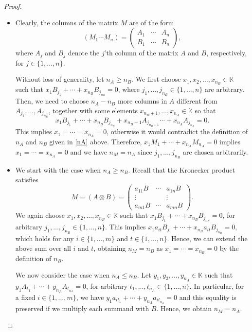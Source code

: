 \documentclass[11pt]{amsart}
\theoremstyle{plain}
\theoremstyle{definition}
\numberwithin{equation}{section}
\newcommand{\K}{\mathbb{K}}
\begin{document}
\begin{proof}\hfill
\begin{itemize}
\item[i.] Clearly, the columns of the matrix $M$ are of the form $$(M_1 \cdots M_n)=\begin{pmatrix}
A_{1} & \cdots & A_{n}\\
B_{1} & \cdots & B_{n}
\end{pmatrix},$$
where $A_{j}$ and $B_j$ denote the $j$'th column of the matrix $A$ and $B$, respectively, for $j\in\{1,\ldots,n\}$.

Without loss of generality, let $n_A\geq n_B$. We first choose $x_1, x_2, \ldots, x_{n_B}\in\K$ such that $x_1 B_{j_1} + \cdots + x_{n_B} B_{j_{n_B}}=0$, where $j_1,\ldots,j_{n_B}\in\{1,\ldots,n\}$ are arbitrary. Then, we need to choose $n_A-n_B$ more columns in $A$ different from $A_{j_1},\ldots,A_{j_{n_B}}$, together with some elements $x_{n_B+1}, \ldots, x_{n_A}\in\K$ so that
$$x_1 B_{j_1} + \cdots + x_{n_B} B_{j_{n_B}} + x_{n_B+1} A_{j_{n_B+1}} \cdots + x_{n_A} A_{j_{n_A}}=0.$$
This implies $x_1=\cdots = x_{n_A}=0$, otherwise it would contradict the definition of $n_A$ and $n_B$ given in \eqref{nA} above. Therefore, $x_1 M_1 + \cdots + x_{n_A} M_{n_A}=0$ implies $x_1=\cdots = x_{n_A}=0$ and we have $n_M=n_A$ since $j_1,\ldots,j_{n_B}$ are chosen arbitrarily.

\item[ii.] We start with the case when $n_A\geq n_B$. Recall that the Kronecker product satisfies
\[M=(A\otimes B)=\begin{pmatrix}
a_{11}B & \cdots & a_{1n}B\\
\vdots & & \vdots\\
a_{m1}B & \cdots & a_{mn}B
\end{pmatrix}.\]
We again choose $x_1, x_2, \ldots, x_{n_B}\in\K$ such that $x_1 B_{j_1} + \cdots + x_{n_B} B_{j_{n_B}}=0$, for arbitrary $j_1,\ldots,j_{n_B}\in\{1,\ldots,n\}$. This implies $x_1 a_{it} B_{j_1} + \cdots + x_{n_B} a_{it} B_{j_{n_B}}=0$, which holds for any $i\in\{1,\ldots,m\}$ and $t\in\{1,\ldots,n\}$. Hence, we can extend the above sum over all $i$ and $t$, obtaining $n_M=n_B$ as $x_1=\cdots = x_{n_B}=0$ by the definition of $n_B$.

We now consider the case when $n_A\leq n_B$. Let $y_1, y_2, \ldots, y_{n_A}\in\K$ such that $y_1 A_{t_1} + \cdots + y_{n_A} A_{t_{n_A}}=0$, for arbitrary $t_1,\ldots,t_{n_A}\in\{1,\ldots,n\}$. In particular, for a fixed $i\in\{1,\ldots,m\}$, we have $y_1 a_{it_1} + \cdots + y_{n_A} a_{it_{n_A}}=0$ and this equality is preserved if we multiply each summand with $B$. Hence, we obtain $n_M=n_A$.
\end{itemize}
\end{proof}
\end{document}

